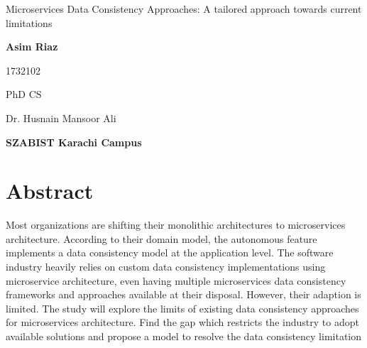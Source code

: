 \documentclass[a4paper,12pt]{article}
\begin{document}
%
\begin{center}
				
				
			
	{\LARGE Microservices Data Consistency Approaches: A tailored approach towards current limitations}
			
	\vspace{2cm}
			
	{\Large \bfseries Asim Riaz}
			
	\vspace{2cm}
				
	{\large 1732102}
				
	\vspace{3cm}
	
	{\Large  PhD CS}			
	\vspace{4cm}
	
	{\Large  Dr. Husnain Mansoor Ali}
	
	\vfill
		
	{\LARGE \bfseries SZABIST Karachi Campus	}
\end{center}






\thispagestyle{empty}

\newpage
\singlespacing %
\tableofcontents
{}   
 
\newpage
    
\section*{Abstract}
%
Most organizations are shifting their monolithic architectures to microservices architecture. According to their domain model, the autonomous feature implements a data consistency model at the application level.  The software industry heavily relies on custom data consistency implementations using microservice architecture, even having multiple microservices data consistency frameworks and approaches available at their disposal. However, their adaption is limited. The study will explore the limits of existing data consistency approaches for microservices architecture. Find the gap which restricts the industry to adopt available solutions and propose a model to resolve the data consistency limitation
\end{document}
